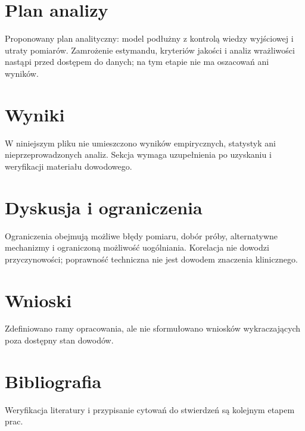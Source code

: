 \documentclass[11pt,a4paper]{article}
\begin{document}
\section{Plan analizy}

Proponowany plan analityczny: model podłużny z kontrolą wiedzy wyjściowej i utraty pomiarów. Zamrożenie estymandu, kryteriów jakości i analiz wrażliwości nastąpi przed dostępem do danych; na tym etapie nie ma oszacowań ani wyników.

\section{Wyniki}

W niniejszym pliku nie umieszczono wyników empirycznych, statystyk ani nieprzeprowadzonych analiz. Sekcja wymaga uzupełnienia po uzyskaniu i weryfikacji materiału dowodowego.

\section{Dyskusja i ograniczenia}

Ograniczenia obejmują możliwe błędy pomiaru, dobór próby, alternatywne mechanizmy i ograniczoną możliwość uogólniania. Korelacja nie dowodzi przyczynowości; poprawność techniczna nie jest dowodem znaczenia klinicznego.

\section{Wnioski}

Zdefiniowano ramy opracowania, ale nie sformułowano wniosków wykraczających poza dostępny stan dowodów.

\section*{Bibliografia}

Weryfikacja literatury i przypisanie cytowań do stwierdzeń są kolejnym etapem prac.
\end{document}
